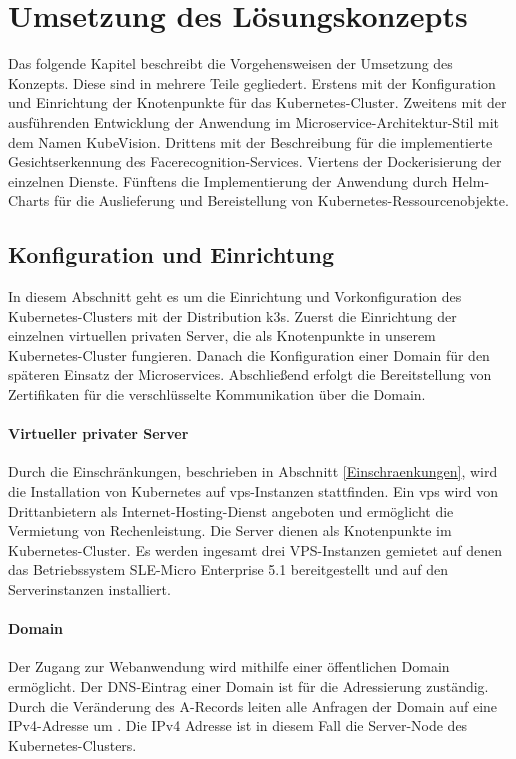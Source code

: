 \chapter{Umsetzung des Lösungskonzepts}\label{Umsetzung}

Das folgende Kapitel beschreibt die Vorgehensweisen der Umsetzung des Konzepts.
Diese sind in mehrere Teile gegliedert.
Erstens mit der Konfiguration und Einrichtung der Knotenpunkte für das Kubernetes-Cluster.
Zweitens mit der ausführenden Entwicklung der Anwendung im Microservice-Architektur-Stil mit dem Namen KubeVision.
Drittens mit der Beschreibung für die implementierte Gesichtserkennung des Facerecognition-Services.
Viertens der Dockerisierung der einzelnen Dienste.
Fünftens die Implementierung der Anwendung durch Helm-Charts für die Auslieferung und Bereistellung von Kubernetes-Ressourcenobjekte. 

\section{Konfiguration und Einrichtung}\label{konfig}

In diesem Abschnitt geht es um die Einrichtung und Vorkonfiguration des Kubernetes-Clusters mit der Distribution k3s.
Zuerst die Einrichtung der einzelnen virtuellen privaten Server, die als Knotenpunkte in unserem Kubernetes-Cluster fungieren.
Danach die Konfiguration einer Domain für den späteren Einsatz der Microservices.
Abschließend erfolgt die Bereitstellung von Zertifikaten für die verschlüsselte Kommunikation über die Domain.

\subsubsection{Virtueller privater Server}

Durch die Einschränkungen, beschrieben in Abschnitt \ref{Einschraenkungen}, wird die Installation von Kubernetes auf \ac{vps}-Instanzen stattfinden.
Ein \acs{vps} wird von Drittanbietern als Internet-Hosting-Dienst angeboten und ermöglicht die Vermietung von Rechenleistung.
Die Server dienen als Knotenpunkte im Kubernetes-Cluster.
Es werden ingesamt drei VPS-Instanzen gemietet auf denen das Betriebssystem SLE-Micro Enterprise 5.1 bereitgestellt und auf den Serverinstanzen installiert.

\subsubsection{Domain}\label{Domain}
Der Zugang zur Webanwendung wird mithilfe einer öffentlichen Domain ermöglicht.
Der DNS-Eintrag einer Domain ist für die Adressierung zuständig.
Durch die Veränderung des A-Records leiten alle Anfragen der Domain auf eine IPv4-Adresse um \cite{LearningCoreDNS}.
Die IPv4 Adresse ist in diesem Fall die Server-Node des Kubernetes-Clusters.

